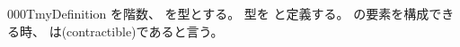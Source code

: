 \documentclass[index]{subfiles}
\begin{document}
\begin{myBlock}{000T}{myDefinition}
  を階数、
  を型とする。
  型を
  と定義する。
  の要素を構成できる時、
  は(contractible)であると言う。
\end{myBlock}
\end{document}
